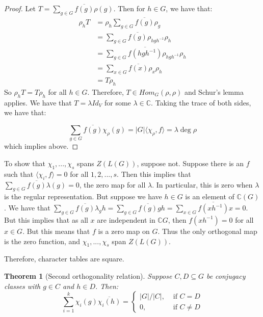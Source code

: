 \documentclass[]{report}
\newtheorem{theorem}{Theorem}
\theoremstyle{definition}
\numberwithin{theorem}{section}
\numberwithin{equation}{section}
\begin{document}
\begin{proof}
	Let $T = \sum_{g \in G} \overline{f(g)} \rho(g)$. Then for $h \in G$, we have that:
	\begin{align*}
		\rho_h T &= \rho_h \sum_{g \in G} \overline{f(g)} \rho_g\\
		 &=\sum_{g \in G} \overline{f(g)} \rho_{h g h^{-1}} \rho_h\\
		 &=\sum_{g \in G} \overline{f(h g h^{-1})} \rho_{h g h^{-1}} \rho_h\\
		 &=\sum_{x \in G} \overline{f(x)} \rho_{x} \rho_h\\
		 &= T \rho_h
	\end{align*}
	So $\rho_h T = T \rho_h$ for all $h \in G$. Therefore, $T \in Hom_G(\rho, \rho)$ and Schur's lemma applies. We have that $T = \lambda Id_V$ for some $\lambda \in \mathbb{C}$. Taking the trace of both sides, we have that:
	
	\begin{equation}
		\sum_{g \in G} \overline{f(g)} \chi_\rho(g) = |G| \langle \chi_\rho, f \rangle = \lambda \deg \rho 
	\end{equation}
	which implies above. 
\end{proof}

To show that $\chi_1, ..., \chi_s$ spans $Z(L(G))$, suppose not. Suppose there is an $f$ such that $\langle \chi_i, f \rangle = 0$ for all $1, 2, ..., s$. Then this implies that $\sum_{g \in G} \overline{f(g)} \lambda(g) = 0$, the zero map for all $\lambda$. In particular, this is zero when $\lambda$ is the regular representation. But suppose we have $h \in G$ is an element of $\mathbb{C}(G)$. We have that $\sum_{g \in G} \overline{f(g)} \lambda_g h = \sum_{g \in G} \overline{f(g)} gh = \sum_{x \in G} \overline{f(x h^{-1})} x = 0$. But this implies that as all $x$ are independent in $\mathbb{C}G$, then $f(x h^{-1}) = 0$ for all $x \in G$. But this means that $f$ is a zero map on $G$. Thus the only orthogonal map is the zero function, and $\chi_1, ..., \chi_s$ span $Z(L(G))$. 

Therefore, character tables are square. 

\begin{theorem}[Second orthogonality relation]
	Suppose $C, D \subseteq G$ be conjugacy classes with $g \in C$ and $h \in D$. Then:
	\begin{equation}
		\sum_{i = 1}^k \chi_i(g) \overline{\chi_i(h)} = \begin{cases}
			|G|/|C|, & \text{ if } C = D\\
			0, & \text{ if } C \neq D
		\end{cases}
	\end{equation}
\end{theorem}
\end{document}
